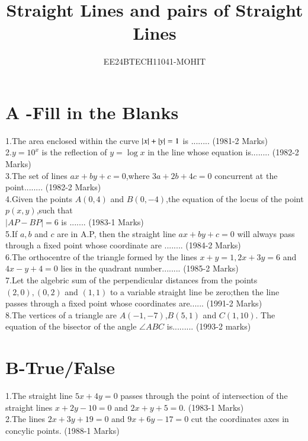 \documentclass[journal,12pt,twocolumn]{IEEEtran}
\theoremstyle{remark}
\begin{document}

\vspace{3cm}

\title{Straight Lines and pairs of Straight Lines}
\author{EE24BTECH11041-MOHIT}
\maketitle
\newpage
\bigskip

\renewcommand{\thefigure}{\theenumi}
\renewcommand{\thetable}{\theenumi}

\section {A -Fill in the Blanks}
1.The area enclosed within the curve $\left\vert x\right\vert+\left\vert y\right\vert=1$ is ........
\hfill(1981-2 Marks)\\
2.$y = 10^x $ is the reflection of $y=\log x$ in the  line whose equation is........
\hfill(1982-2 Marks)\\
3.The set of lines $ax+by+c=0$,where $3a+2b+4c=0$ concurrent at the point........
\hfill(1982-2 Marks)\\
4.Given the points $A(0,4)$ and $B(0,-4)$,the equation of the locus of the point $p(x,y)$,such that \\
    $|AP-BP|=6$ is .......
\hfill(1983-1 Marks)\\
5.If $a,b$ and $c$ are in A.P, then the straight line $ax +by +c=0$ will always pass through a fixed point whose coordinate are ........
\hfill(1984-2 Marks)\\
6.The orthocentre of the triangle formed by the lines $x+y=1,2x +3y=6$ and $4x-y+4=0$ lies in the quadrant number........
\hfill(1985-2 Marks)\\
7.Let the algebric sum of the perpendicular distances from the points $(2,0),(0,2)$ and $(1,1)$ to a variable straight line be zero;then the line passes through a fixed point whose coordinates are......
\hfill(1991-2 Marks)\\
8.The vertices of a triangle are $A(-1,-7)$,$B(5,1)$ and $C(1,10)$. The equation of the bisector of the angle $\angle{ABC}$ is.........
\hfill(1993-2 marks)\\
\section {B-True/False}
1.The straight line $5x+4y=0$ passes through the point of intersection of the straight lines $x+2y-10=0$ and $2x+y+5=0$.
\hfill(1983-1 Marks)\\
2.The lines $2x+3y+19=0$ and $9x+6y-17=0$ cut the coordinates axes in concylic points.
\hfill(1988-1 Marks)
\end{document}
